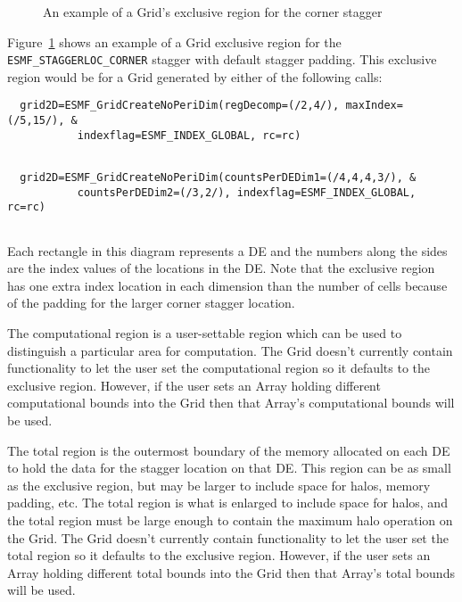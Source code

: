   \begin{center}
  \begin{figure}
  \center
  \caption{An example of a Grid's exclusive region for the corner stagger}
  \label{fig:gridexreg}
  \end{figure}
  \end{center}
  
   Figure~\ref{fig:gridexreg} shows an example of a Grid exclusive region for the
   {\tt ESMF\_STAGGERLOC\_CORNER} stagger with default
   stagger padding. This exclusive region would be for a Grid generated by either of the
   following calls: 

 \begin{verbatim}
  grid2D=ESMF_GridCreateNoPeriDim(regDecomp=(/2,4/), maxIndex=(/5,15/), &
           indexflag=ESMF_INDEX_GLOBAL, rc=rc)
 
\end{verbatim}
 

 \begin{verbatim}
  grid2D=ESMF_GridCreateNoPeriDim(countsPerDEDim1=(/4,4,4,3/), &
           countsPerDEDim2=(/3,2/), indexflag=ESMF_INDEX_GLOBAL, rc=rc)
 
\end{verbatim}
 

   Each rectangle in this diagram represents a DE and the numbers along the sides
   are the index values of the locations in the DE. Note that the exclusive region
   has one extra index location in each dimension than the number of cells
   because of the padding for the larger corner stagger location.
  
   The computational region is a user-settable region which can be used
   to distinguish a particular area for computation. The Grid doesn't
   currently contain functionality to let the user set the computational
   region so it defaults to the exclusive region. However, if the
   user sets an Array holding different computational bounds into the
   Grid then that Array's computational bounds will be used.
  
   The total region is the outermost boundary of the memory allocated
   on each DE to hold the data for the stagger location on that DE. This region
   can be as small as the exclusive region, but may be larger to
   include space for halos, memory padding, etc. The total region is
   what is enlarged to include space for halos, and the total region
   must be large enough to contain the maximum halo operation on the
   Grid. The Grid doesn't currently contain functionality to let the
   user set the total region so it defaults to the exclusive region.
   However, if the
   user sets an Array holding different total bounds into the
   Grid then that Array's total bounds will be used.
  
